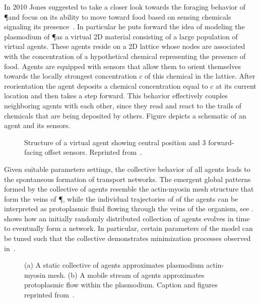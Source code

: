 			In 2010 Jones suggested to take a closer look towards the foraging behavior of \P and focus on its ability to move toward food based on sensing chemicals signaling its presence~\cite{jones2010characteristics}. In particular he puts forward the idea of modeling the plasmodium of \P as a virtual 2D material consisting of a large population of virtual agents. These agents reside on a 2D lattice whose nodes are associated with the concentration of a hypothetical chemical representing the presence of food. Agents are equipped with sensors that allow them to orient themselves towards the locally strongest concentration $c$ of this chemical in the lattice. After reorientation the agent deposits a chemical concentration equal to $c$ at its current location and then takes a step forward. This behavior effectively couples neighboring agents with each other, since they read and react to the trails of chemicals that are being deposited by others. Figure  depicts a schematic of an agent and its sensors.

			\begin{figure}
				\centering
				
				\caption[Multi-agent \P - Agent schematic]{Structure of a virtual agent showing central position and $3$ forward-facing offset sensors. Reprinted from~\cite{jones2010characteristics}.}
				\label{fig:agent}
			\end{figure}

			Given suitable parameters settings, the collective behavior of all agents leads to the spontaneous formation of transport networks. The emergent global patterns formed by the collective of agents resemble the actin-myosin mesh structure that form the veins of \P, while the individual trajectories of of the agents can be interpreted as protoplasmic fluid flowing through the veins of the organism, see .  shows how an initially randomly distributed collection of agents evolves in time to eventually form a network. In particular, certain parameters of the model can be tuned such that the collective demonstrates minimization processes observed in~\cite{jones2011influences,jones2015applications,baumgarten2015network}. 

			\begin{figure}
				\centering
				
				\caption[Multi-agent \P - Collective behavior of agents]{(a) A static collective of agents approximates plasmodium actin-myosin mesh. (b) A mobile stream of agents approximates protoplasmic flow within the plasmodium. Caption and figures reprinted from~\cite{jones2010characteristics}.}
				\label{fig:agent_structures}
			\end{figure}

